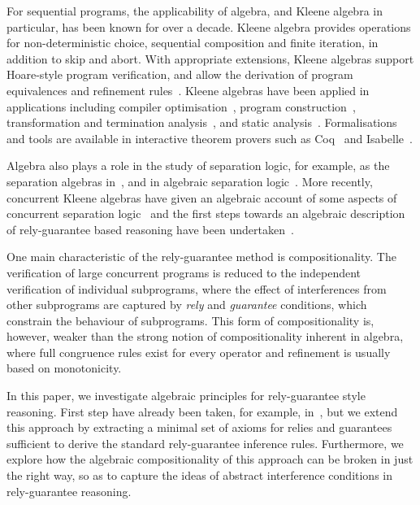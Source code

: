 \documentclass{llncs}
\begin{document}
For sequential programs, the applicability of algebra, and Kleene
algebra in particular, has been known for over a decade. Kleene
algebra provides operations for non-deterministic choice, sequential
composition and finite iteration, in addition to skip and abort. With
appropriate extensions, Kleene algebras support Hoare-style program
verification, and allow the derivation of program equivalences and
refinement rules~\cite{kozen_kleene_1997,hoare_concurrent_2011}. Kleene algebras have
been applied in applications including compiler
optimisation~\cite{kozen_certification_2000}, program
construction~\cite{berghammer_automated_2010}, transformation and
termination analysis~\cite{desharnais_algebraic_2011}, and static
analysis~\cite{fernandes_describing_2007}. Formalisations and tools are
available in interactive theorem provers such as Coq~\cite{pous_kleene_2013} and
Isabelle~\cite{armstrong_kleene_2013,armstrong_program_2013,armstrong_algebras_2014}.

Algebra also plays a role in the study of separation logic, for
example, as the separation algebras in~\cite{calcagno_local_2007}, and in algebraic
separation logic~\cite{dang_algebraic_2011}. More recently,
concurrent Kleene algebras have given an algebraic account of some
aspects of concurrent separation logic~\cite{hoare_concurrent_2011,hoare_locality_2011} and
the first steps towards an algebraic description of rely-guarantee
based reasoning have been undertaken~\cite{hoare_concurrent_2011}.

One main characteristic of the rely-guarantee method is
compositionality. The verification of large concurrent programs is
reduced to the independent verification of individual subprograms,
where the effect of interferences from other subprograms are captured
by \emph{rely} and \emph{guarantee} conditions, which constrain the
behaviour of subprograms. This form of compositionality is, however,
weaker than the strong notion of compositionality inherent in algebra,
where full congruence rules exist for every operator and refinement is
usually based on monotonicity.

In this paper, we investigate algebraic principles for rely-guarantee
style reasoning. First step have already been taken, for example,
in~\cite{hoare_concurrent_2011}, but we extend this approach by extracting a minimal set
of axioms for relies and guarantees sufficient to derive the standard
rely-guarantee inference rules. Furthermore, we explore how the
algebraic compositionality of this approach can be broken in just the
right way, so as to capture the ideas of abstract interference
conditions in rely-guarantee reasoning.
\end{document}

